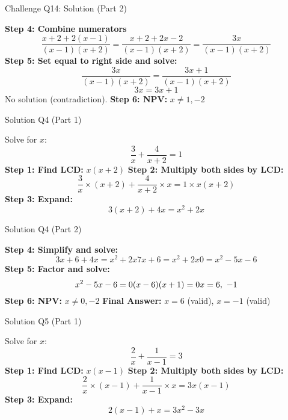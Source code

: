 \documentclass[aspectratio=169]{beamer}
\begin{document}
\begin{frame}{Challenge Q14: Solution (Part 2)}
\begin{tcolorbox}[colback=lightgray,colframe=accent,title=Step-by-Step Solution (Part 2)]
\footnotesize
\textbf{Step 4: Combine numerators}
\[
\frac{x+2 + 2(x-1)}{(x-1)(x+2)} = \frac{x+2+2x-2}{(x-1)(x+2)} = \frac{3x}{(x-1)(x+2)}
\]
\textbf{Step 5: Set equal to right side and solve:}
\[
\frac{3x}{(x-1)(x+2)} = \frac{3x+1}{(x-1)(x+2)}
\]
\[
3x = 3x+1
\]
No solution (contradiction).
\textbf{Step 6: NPV:} $x \neq 1, -2$
\end{tcolorbox}
\end{frame}

\begin{frame}{Solution Q4 (Part 1)}
\begin{tcolorbox}[colback=lightgray,colframe=accent,title=Solution Q4 (Part 1)]
\footnotesize
Solve for $x$:
\[
\frac{3}{x} + \frac{4}{x+2} = 1
\]
\textbf{Step 1: Find LCD:} $x(x+2)$
\textbf{Step 2: Multiply both sides by LCD:}
\[
\frac{3}{x} \times (x+2) + \frac{4}{x+2} \times x = 1 \times x(x+2)
\]
\textbf{Step 3: Expand:}
\[
3(x+2) + 4x = x^2 + 2x
\]
\end{tcolorbox}
\end{frame}

\begin{frame}{Solution Q4 (Part 2)}
\begin{tcolorbox}[colback=lightgray,colframe=accent,title=Solution Q4 (Part 2)]
\footnotesize
\textbf{Step 4: Simplify and solve:}
\[
3x + 6 + 4x = x^2 + 2x
7x + 6 = x^2 + 2x
0 = x^2 - 5x - 6
\]
\textbf{Step 5: Factor and solve:}
\[
x^2 - 5x - 6 = 0 \\
(x-6)(x+1) = 0 \\
x = 6,\ -1
\]
\textbf{Step 6: NPV:} $x \neq 0, -2$
\textbf{Final Answer:} $x=6$ (valid), $x=-1$ (valid)
\end{tcolorbox}
\end{frame}

\begin{frame}{Solution Q5 (Part 1)}
\begin{tcolorbox}[colback=lightgray,colframe=accent,title=Solution Q5 (Part 1)]
\footnotesize
Solve for $x$:
\[
\frac{2}{x} + \frac{1}{x-1} = 3
\]
\textbf{Step 1: Find LCD:} $x(x-1)$
\textbf{Step 2: Multiply both sides by LCD:}
\[
\frac{2}{x} \times (x-1) + \frac{1}{x-1} \times x = 3x(x-1)
\]
\textbf{Step 3: Expand:}
\[
2(x-1) + x = 3x^2 - 3x
\]
\end{tcolorbox}
\end{frame}
\end{document}
